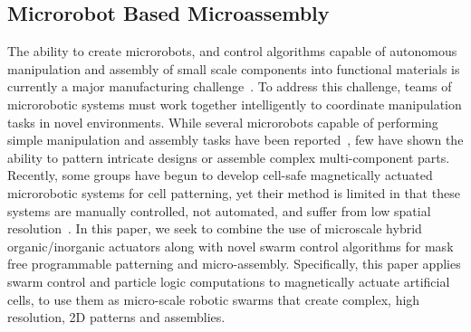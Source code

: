 \subsection{Microrobot Based Microassembly}
The ability to create microrobots, and control algorithms capable of autonomous manipulation and assembly of small scale components into functional materials is currently a major manufacturing challenge~\cite{chang2005therapeutic}. 
To address this challenge, teams of microrobotic systems must work together intelligently to coordinate manipulation tasks in novel environments. 
While several microrobots capable of performing simple manipulation and assembly tasks have been reported~\cite{prakash2007artificial,chang2007artificial,weibel2007microfabrication,abbott2007robotics,yi2006microfluidics,castillo2009manipulation}, few have shown the ability to pattern intricate designs or assemble complex multi-component parts. 
Recently, some groups have begun to develop cell-safe magnetically actuated microrobotic systems for cell patterning, yet their method is limited in that these systems are manually controlled, not automated, and suffer from low spatial resolution~\cite{tasoglu2014untethered,tasoglu2014guided}. 
In this paper, we seek to combine the use of microscale hybrid organic/inorganic actuators along with novel swarm control algorithms for mask free programmable patterning and micro-assembly. 
Specifically, this paper applies swarm control and particle logic computations to magnetically actuate artificial cells, to use them as micro-scale robotic swarms that create complex, high resolution, 2D patterns and assemblies.

